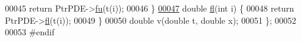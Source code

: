 \begin{DoxyCode}
00045       \textcolor{keywordflow}{return} PtrPDE->\hyperlink{classParabPDE_a8a1850597550bf8aab3b5dca2aed6ff8}{fu}(t(i));
00046     \}
\hypertarget{FDMethod_8h_source_l00047}{}\hyperlink{classFDMethod_add9102baa92871331350bf5d86c12f1a}{00047}     \textcolor{keywordtype}{double} \hyperlink{classFDMethod_add9102baa92871331350bf5d86c12f1a}{fl}(\textcolor{keywordtype}{int} i) \{
00048       \textcolor{keywordflow}{return} PtrPDE->\hyperlink{classParabPDE_aa083d2745f44daba57ad296749eb7ec0}{fl}(t(i));
00049     \}
00050     \textcolor{keywordtype}{double} v(\textcolor{keywordtype}{double} t, \textcolor{keywordtype}{double} x);
00051 \};
00052 
00053 \textcolor{preprocessor}{#endif}
\end{DoxyCode}
